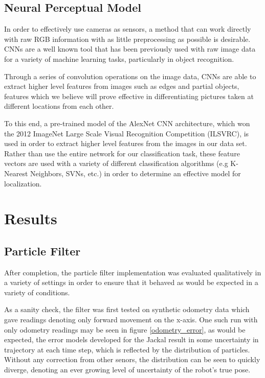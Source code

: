\documentclass[letterpaper, 12 pt, conference]{ieeeconf}  %
\begin{document}
\subsection{Neural Perceptual Model}
In order to effectively use cameras as sensors, a method that can work directly with raw RGB information with as little preprocessing as possible is desirable. CNNs are a well known tool that has been previously used with raw image data for a variety of machine learning tasks, particularly in object recognition. 
\par
Through a series of convolution operations on the image data, CNNs are able to extract higher level features from images such as edges and partial objects, features which we believe will prove effective in differentiating pictures taken at different locations from each other. 
\par
To this end, a pre-trained model of the AlexNet CNN architecture, which won the 2012 ImageNet Large Scale Visual Recognition Competition (ILSVRC), is used in order to extract higher level features from the images in our data set. Rather than use the entire network for our classification task, these feature vectors are used with a variety of different classification algorithms (e.g K-Nearest Neighbors, SVNs, etc.) in order to determine an effective model for localization.  


\section{Results}

\subsection{Particle Filter}

After completion, the particle filter implementation was evaluated qualitatively in a variety of settings in order to ensure that it behaved as would be expected in a variety of conditions. 
\par
As a sanity check, the filter was first tested on synthetic odometry data which gave readings denoting only forward movement on the x-axis. One such run with only odometry readings may be seen in figure \ref{odometry_error}, as would be expected, the error models developed for the Jackal result in some uncertainty in trajectory at each time step, which is reflected by the distribution of particles. Without any correction from other senors, the distribution can be seen to quickly diverge, denoting an ever growing level of uncertainty of the robot's true pose. 
\end{document}
